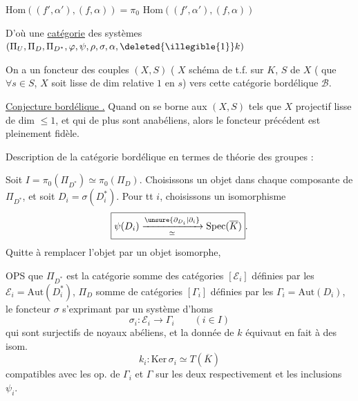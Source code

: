 $\mathrm{Hom}((f',\alpha'),(f,\alpha))=\pi_0$
\uline{$\mathrm{Hom}$}$((f',\alpha'),(f,\alpha))$

D'où une \uline{catégorie} des
 systèmes
$(\Pi_U,\Pi_D,\Pi_{D^*},\varphi,\psi,\rho,\sigma,\alpha,
\deleted{\illegible{1}}k)$


On a un foncteur des couples $(X,S)$
( $X$ schéma  de t.f. sur $K$,
$S$ \uline{} 
  de $X$
 ( que $\forall s\in S$, $X$
soit lisse de dim relative $1$ en $s$)
vers cette catégorie bordélique $\mathcal B$.


\uline{Conjecture bordélique .}
Quand on se borne aux $(X,S)$ tels que $X$ projectif lisse de dim
$\leq 1$, et qui de plus sont anabéliens, alors le foncteur
précédent est pleinement fidèle.


Description de la catégorie bordélique en termes de théorie des groupes :

Soit $I=\pi_0(\Pi_{D^*})\simeq\pi_0(\Pi_D)$.
Choisissons un objet  dans chaque composante de
$\Pi_{D^*}$, et soit $D_i=\sigma(D_i^*)$.
Pour tt $i$, choisissons un isomorphisme
\[
\boxed{\psi(D_i)\xrightarrow[\simeq]{\unsure{\partial_{D_i}|\partial_i}}
\mathrm{Spec}(\overline K)}.
\]
Quitte à remplacer l'objet par un  objet isomorphe,


OPS que $\Pi_{D^*}$ est la catégorie somme des catégories
$[\mathcal E_i]$ définies par les
$\mathcal E_i=\mathrm{Aut}(D_i^*)$, $\Pi_D$
 
somme de catégories $[\Gamma_i]$ définies par les
$\Gamma_i=\mathrm{Aut}(D_i)$, le foncteur $\sigma$ s'exprimant
par un système d'homs
\[
\sigma_i:\mathcal E_i\to\Gamma_i\qquad(i\in I)
\]
qui sont surjectifs de noyaux abéliens,
et la donnée de $k$ équivaut en fait à des isom.
\[
k_i:\mathrm{Ker}\,\sigma_i\simeq T(\overline K)
\]
compatibles avec les op. de $\Gamma_i$ et $\Gamma$ sur les deux
 respectivement et les inclusions $\psi_i$.

